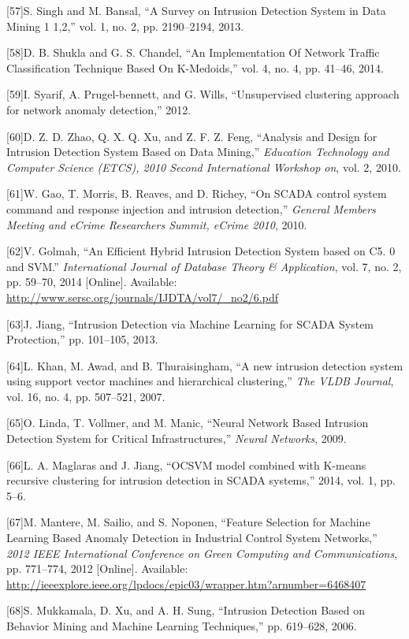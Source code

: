 \documentclass[11pt,]{article}
\begin{document}
{[}57{]}S. Singh and M. Bansal, ``A Survey on Intrusion Detection System
in Data Mining 1 1,2,'' vol. 1, no. 2, pp. 2190--2194, 2013.

{[}58{]}D. B. Shukla and G. S. Chandel, ``An Implementation Of Network
Traffic Classification Technique Based On K-Medoids,'' vol. 4, no. 4,
pp. 41--46, 2014.

{[}59{]}I. Syarif, A. Prugel-bennett, and G. Wills, ``Unsupervised
clustering approach for network anomaly detection,'' 2012.

{[}60{]}D. Z. D. Zhao, Q. X. Q. Xu, and Z. F. Z. Feng, ``Analysis and
Design for Intrusion Detection System Based on Data Mining,''
\emph{Education Technology and Computer Science (ETCS), 2010 Second
International Workshop on}, vol. 2, 2010.

{[}61{]}W. Gao, T. Morris, B. Reaves, and D. Richey, ``On SCADA control
system command and response injection and intrusion detection,''
\emph{General Members Meeting and eCrime Researchers Summit, eCrime
2010}, 2010.

{[}62{]}V. Golmah, ``An Efficient Hybrid Intrusion Detection System
based on C5. 0 and SVM.'' \emph{International Journal of Database Theory
\& Application}, vol. 7, no. 2, pp. 59--70, 2014 {[}Online{]}.
Available: \url{http://www.sersc.org/journals/IJDTA/vol7/_no2/6.pdf}

{[}63{]}J. Jiang, ``Intrusion Detection via Machine Learning for SCADA
System Protection,'' pp. 101--105, 2013.

{[}64{]}L. Khan, M. Awad, and B. Thuraisingham, ``A new intrusion
detection system using support vector machines and hierarchical
clustering,'' \emph{The VLDB Journal}, vol. 16, no. 4, pp. 507--521,
2007.

{[}65{]}O. Linda, T. Vollmer, and M. Manic, ``Neural Network Based
Intrusion Detection System for Critical Infrastructures,'' \emph{Neural
Networks}, 2009.

{[}66{]}L. A. Maglaras and J. Jiang, ``OCSVM model combined with K-means
recursive clustering for intrusion detection in SCADA systems,'' 2014,
vol. 1, pp. 5--6.

{[}67{]}M. Mantere, M. Sailio, and S. Noponen, ``Feature Selection for
Machine Learning Based Anomaly Detection in Industrial Control System
Networks,'' \emph{2012 IEEE International Conference on Green Computing
and Communications}, pp. 771--774, 2012 {[}Online{]}. Available:
\url{http://ieeexplore.ieee.org/lpdocs/epic03/wrapper.htm?arnumber=6468407}

{[}68{]}S. Mukkamala, D. Xu, and A. H. Sung, ``Intrusion Detection Based
on Behavior Mining and Machine Learning Techniques,'' pp. 619--628,
2006.
\end{document}
